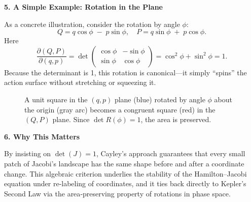 \textbf{5. A Simple Example: Rotation in the Plane}

As a concrete illustration, consider the rotation by angle \(\phi\):
\[
Q = q\cos\phi \;-\; p\sin\phi,
\quad
P = q\sin\phi \;+\; p\cos\phi.
\]
Here
\[
\frac{\partial(Q,P)}{\partial(q,p)}
=
\det
\begin{pmatrix}
\cos\phi & -\sin\phi\\[6pt]
\sin\phi & \cos\phi
\end{pmatrix}
= \cos^2\phi + \sin^2\phi = 1.
\]
Because the determinant is 1, this rotation is canonical—it simply “spins” the action surface without stretching or squeezing it.


\begin{figure}[H]
    \centering
    \caption{A unit square in the $(q,p)$ plane (blue) rotated by angle $\phi$ about the origin (gray arc) becomes a congruent square (red) in the $(Q,P)$ plane.  Since $\det R(\phi)=1$, the area is preserved.}
\end{figure}





\textbf{6. Why This Matters}

By insisting on \(\det(J)=1\), Cayley’s approach guarantees that every small patch of Jacobi’s landscape has the same shape before and after a coordinate change.  This algebraic criterion underlies the stability of the Hamilton–Jacobi equation under re‐labeling of coordinates, and it ties back directly to Kepler’s Second Law via the area‐preserving property of rotations in phase space.




